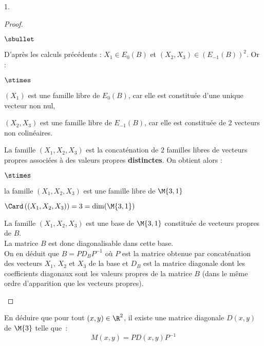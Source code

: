 \documentclass[11pt]{article}%
\begin{document}
\begin{noliste}{1.}
\begin{proof}
\begin{noliste}{$\sbullet$}
    \item D'après les calculs précédents : $X_1 \in E_0(B)$ et
      $(X_2,X_3) \in \left(E_{-1}(B)\right)^2$. Or :
      \begin{noliste}{$\stimes$}
      \item $(X_1)$ est une famille libre de $E_0(B)$, car elle est 
        constituée d'une unique vecteur non nul,
      \item $(X_2,X_3)$ est une famille libre de $E_{-1}(B)$, car elle
        est constituée de $2$ vecteurs non colinéaires.
      \end{noliste}
    La famille $(X_1,X_2,X_3)$ est la concaténation de $2$ familles
    libres de vecteurs propres associées à des valeurs propres {\bf
      distinctes}. %
    On obtient alors :
    \begin{noliste}{$\stimes$}
      \item la famille $(X_1,X_2,X_3)$ est une famille libre de 
      $\M{3,1}$
      \item $\Card\left((X_1,X_2,X_3)\right)=3=\dim(\M{3,1})$
    \end{noliste}
    
  \item La famille $(X_1, X_2, X_3)$ est une base de $\M{3,1}$
    constituée de vecteurs propres de $B$. \\
    La matrice $B$ est donc diagonalisable dans cette base.\\
    On en déduit que $B = P D_B P^{-1}$ où $P$ est la matrice obtenue
    par concaténation des vecteurs $X_1$, $X_2$ et $X_3$ de la base et
    $D_B$ est la matrice diagonale dont les coefficients diagonaux
    sont les valeurs propres de la matrice $B$ (dans le même ordre
    d'apparition que les vecteurs propres).%
    ~\\[-1.2cm]
  \end{noliste}
 \end{proof}

 
 \item En déduire que pour tout $(x,y) \in \R^2$, il existe une 
 matrice diagonale $D(x,y)$ de $\M{3}$ telle que~:
 \[ 
 M(x,y) = P D(x,y) P^{-1} 
 \]
 

\end{noliste}
\end{document}
